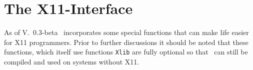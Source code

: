 
\newpage
\section{The X11-Interface}
\label{x11interface}
As of V.\ 0.3-beta \tonelib\ incorporates some special functions that can make
life easier for X11 programmers. Prior to further discussions it should be
noted that these functions, which itself use functions \verb+Xlib+ are
fully optional so that \tonelib\ can still be compiled and used on systems
without X11. 

